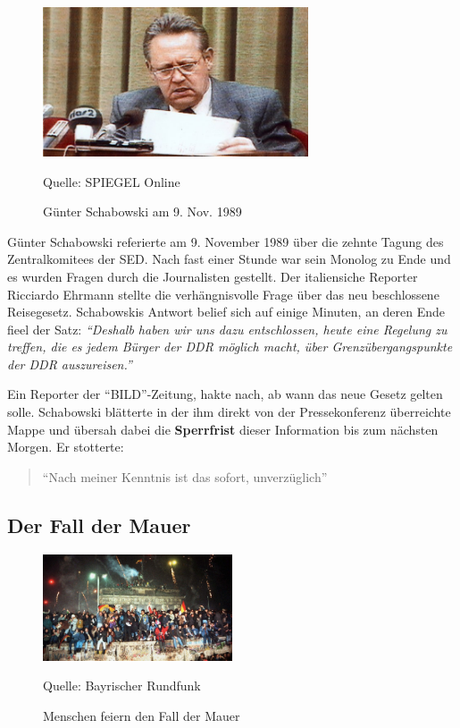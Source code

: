 \documentclass[12pt,a4paper]{article}
\begin{document}
\begin{figure}[hh]
    \centering
    \includegraphics[width=0.7\textwidth]{Bilder/Schabowski.jpg}
    \caption{Günter Schabowski am 9. Nov. 1989}
    Quelle: SPIEGEL Online
    \label{img:schabowski}
\end{figure}

Günter Schabowski referierte am 9. November 1989 über die zehnte Tagung des Zentralkomitees der SED. Nach fast einer Stunde war sein Monolog zu Ende und es wurden Fragen durch die Journalisten gestellt. Der italiensiche Reporter Ricciardo Ehrmann stellte die verhängnisvolle Frage über das neu beschlossene Reisegesetz. Schabowskis Antwort belief sich auf einige Minuten, an deren Ende fieel der Satz: \textit{\enquote{Deshalb haben wir uns dazu entschlossen, heute eine Regelung zu treffen, die es jedem Bürger der DDR möglich macht, über Grenzübergangspunkte der DDR auszureisen.}}

Ein Reporter der \enquote{BILD}-Zeitung, hakte nach, ab wann das neue Gesetz gelten solle. Schabowski blätterte in der ihm direkt von der Pressekonferenz überreichte Mappe und übersah dabei die \textbf{Sperrfrist} dieser Information bis zum nächsten Morgen. Er stotterte:

\begin{quotation}
    \enquote{Nach meiner Kenntnis  ist das sofort, unverzüglich}
\end{quotation}


\subsection{Der Fall der Mauer}

\begin{figure}[hh]
    \centering
    \includegraphics[width=0.5\textwidth]{Bilder/mauerfall.jpg}
    \caption{Menschen feiern den Fall der Mauer}
    Quelle: Bayrischer Rundfunk
    \label{img:mauerfall}
\end{figure}
\end{document}
